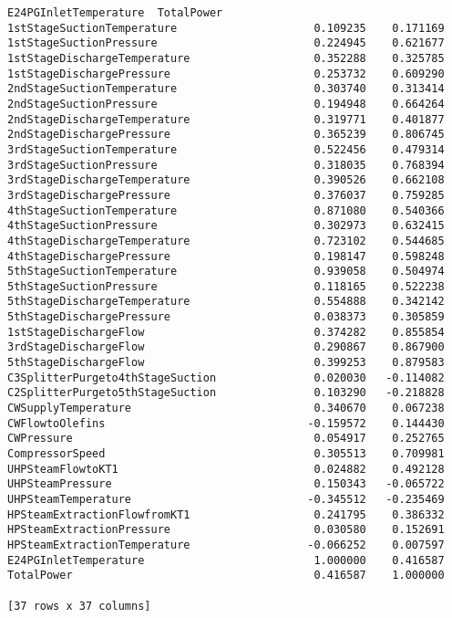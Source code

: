 \documentclass[11pt]{article}
\begin{document}
\begin{tcolorbox}[breakable, size=fbox, boxrule=.5pt, pad at break*=1mm, opacityfill=0]
\begin{Verbatim}[commandchars=\\\{\}]
                                  E24PGInletTemperature  TotalPower
1stStageSuctionTemperature                     0.109235    0.171169
1stStageSuctionPressure                        0.224945    0.621677
1stStageDischargeTemperature                   0.352288    0.325785
1stStageDischargePressure                      0.253732    0.609290
2ndStageSuctionTemperature                     0.303740    0.313414
2ndStageSuctionPressure                        0.194948    0.664264
2ndStageDischargeTemperature                   0.319771    0.401877
2ndStageDischargePressure                      0.365239    0.806745
3rdStageSuctionTemperature                     0.522456    0.479314
3rdStageSuctionPressure                        0.318035    0.768394
3rdStageDischargeTemperature                   0.390526    0.662108
3rdStageDischargePressure                      0.376037    0.759285
4thStageSuctionTemperature                     0.871080    0.540366
4thStageSuctionPressure                        0.302973    0.632415
4thStageDischargeTemperature                   0.723102    0.544685
4thStageDischargePressure                      0.198147    0.598248
5thStageSuctionTemperature                     0.939058    0.504974
5thStageSuctionPressure                        0.118165    0.522238
5thStageDischargeTemperature                   0.554888    0.342142
5thStageDischargePressure                      0.038373    0.305859
1stStageDischargeFlow                          0.374282    0.855854
3rdStageDischargeFlow                          0.290867    0.867900
5thStageDischargeFlow                          0.399253    0.879583
C3SplitterPurgeto4thStageSuction               0.020030   -0.114082
C2SplitterPurgeto5thStageSuction               0.103290   -0.218828
CWSupplyTemperature                            0.340670    0.067238
CWFlowtoOlefins                               -0.159572    0.144430
CWPressure                                     0.054917    0.252765
CompressorSpeed                                0.305513    0.709981
UHPSteamFlowtoKT1                              0.024882    0.492128
UHPSteamPressure                               0.150343   -0.065722
UHPSteamTemperature                           -0.345512   -0.235469
HPSteamExtractionFlowfromKT1                   0.241795    0.386332
HPSteamExtractionPressure                      0.030580    0.152691
HPSteamExtractionTemperature                  -0.066252    0.007597
E24PGInletTemperature                          1.000000    0.416587
TotalPower                                     0.416587    1.000000

[37 rows x 37 columns]
\end{Verbatim}
\end{tcolorbox}
        
\end{document}
